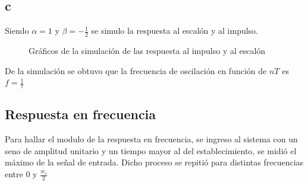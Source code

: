 \documentclass[../../guia1.tex]{subfiles}
\begin{document}
\subsection*{c}
Siendo $\alpha = 1$ y $\beta = -\frac{1}{2}$ se simulo la respuesta al escalón y al impulso.
\begin{figure}[H]
 \centering

 \caption{Gráficos de la simulación de las respuesta al impulso y al escalón}
 \label{f:ejc}
\end{figure}
De la simulación se obtuvo que la frecuencia de oscilación en función de $nT$ es $f= \frac{1}{7}$
\subsection*{Respuesta en frecuencia}
Para hallar el modulo de la respuesta en frecuencia, se ingreso al sistema con un seno de amplitud unitario y un tiempo mayor al del establecimiento, se midió el máximo de la se\~nal de entrada. Dicho proceso se repitió para distintas frecuencias entre 0 y $\frac{w_s}{2} $
\end{document}
